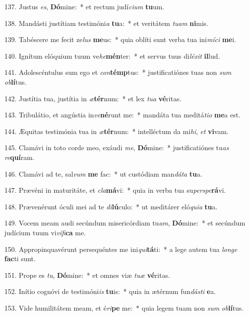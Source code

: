 137. Justus \textit{es}, \textbf{Dó}mine:~*  et rectum judí\textit{ci}\textit{um} \textbf{tu}um.\

138. Mandásti justítiam testimóni\textit{a} \textbf{tu}a:~*  et veritátem \textit{tu}\textit{am} \textbf{ni}mis.\

139. Tabéscere me fecit ze\textit{lus} \textbf{me}us:~*  quia oblíti sunt verba tua ini\textit{mí}\textit{ci} \textbf{me}i.\

140. Ignítum elóquium tuum ve\textit{he}\textbf{mén}ter:~*  et servus tuus di\textit{lé}\textit{xit} \textbf{il}lud.\

141. Adolescéntulus sum ego et \textit{con}\textbf{témp}tus:~*  justificatiónes tuas non \textit{sum} \textit{ob}\textbf{lí}tus.\

142. Justítia tua, justítia in \textit{æ}\textbf{tér}num:~*  et lex \textit{tu}\textit{a} \textbf{vé}ritas.\

143. Tribulátio, et angústia in\textit{ve}\textbf{né}runt me:~*  mandáta tua meditá\textit{ti}\textit{o} \textbf{me}a est.\

144. Æquitas testimónia tua in \textit{æ}\textbf{tér}num:~*  intelléctum da mi\textit{hi}, \textit{et} \textbf{vi}vam.\

145. Clamávi in toto corde meo, exáudi \textit{me}, \textbf{Dó}mine:~*  justificatiónes tu\textit{as} \textit{re}\textbf{quí}ram.\

146. Clamávi ad te, sal\textit{vum} \textbf{me} fac:~*  ut custódiam man\textit{dá}\textit{ta} \textbf{tu}a.\

147. Prævéni in maturitáte, et \textit{cla}\textbf{má}vi:~*  quia in verba tua su\textit{per}\textit{spe}\textbf{rá}vi.\

148. Prævenérunt óculi mei ad te \textit{di}\textbf{lú}culo:~*  ut meditárer eló\textit{qui}\textit{a} \textbf{tu}a.\

149. Vocem meam audi secúndum misericórdiam tu\textit{am}, \textbf{Dó}mine:~*  et secúndum judícium tuum vi\textit{ví}\textit{fi}\textbf{ca} me.\

150. Appropinquavérunt persequéntes me ini\textit{qui}\textbf{tá}ti:~*  a lege autem tua \textit{lon}\textit{ge} \textbf{fac}ti sunt.\

151. Prope es \textit{tu}, \textbf{Dó}mine:~*  et omnes viæ \textit{tu}\textit{æ} \textbf{vé}ritas.\

152. Inítio cognóvi de testimóni\textit{is} \textbf{tu}is:~*  quia in ætérnum fun\textit{dás}\textit{ti} \textbf{e}a.\

153. Vide humilitátem meam, et é\textit{ri}\textbf{pe} me:~*  quia legem tuam non \textit{sum} \textit{ob}\textbf{lí}tus.\

